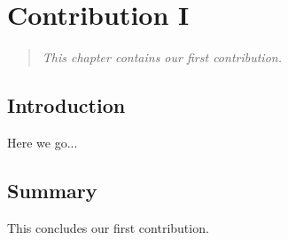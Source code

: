 \chapter{Contribution I}\label{chap:contribution}

\minitoc %

\begin{quote}
{\it This chapter contains our first contribution.}
\end{quote}

\section{Introduction}\label{chap:contribution:intro}

Here we go...

\section{Summary}\label{chap:contribution:summary}

This concludes our first contribution.
